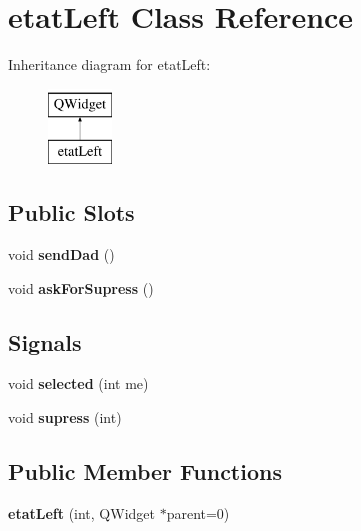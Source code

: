 \hypertarget{classetat_left}{\section{etat\-Left Class Reference}
\label{classetat_left}
}
Inheritance diagram for etat\-Left\-:\begin{figure}[H]
\begin{center}
\leavevmode
\includegraphics[height=2.000000cm]{classetat_left}
\end{center}
\end{figure}
\subsection*{Public Slots}
\begin{DoxyCompactItemize}
\item 
\hypertarget{classetat_left_a39c9a7992253a787aeaa9a2b2be5a806}{void {\bfseries send\-Dad} ()}\label{classetat_left_a39c9a7992253a787aeaa9a2b2be5a806}

\item 
\hypertarget{classetat_left_a541d2de7f5227a558e6753f53c6b7ae6}{void {\bfseries ask\-For\-Supress} ()}\label{classetat_left_a541d2de7f5227a558e6753f53c6b7ae6}

\end{DoxyCompactItemize}
\subsection*{Signals}
\begin{DoxyCompactItemize}
\item 
\hypertarget{classetat_left_a9c96e4ffbba54cfc6c281e4ab023b4e6}{void {\bfseries selected} (int me)}\label{classetat_left_a9c96e4ffbba54cfc6c281e4ab023b4e6}

\item 
\hypertarget{classetat_left_a8d4e53e9e84d7865f1f95f404cb55132}{void {\bfseries supress} (int)}\label{classetat_left_a8d4e53e9e84d7865f1f95f404cb55132}

\end{DoxyCompactItemize}
\subsection*{Public Member Functions}
\begin{DoxyCompactItemize}
\item 
\hypertarget{classetat_left_ac7e09685da20850a612f710d3db145f7}{{\bfseries etat\-Left} (int, Q\-Widget $\ast$parent=0)}\label{classetat_left_ac7e09685da20850a612f710d3db145f7}

\end{DoxyCompactItemize}
